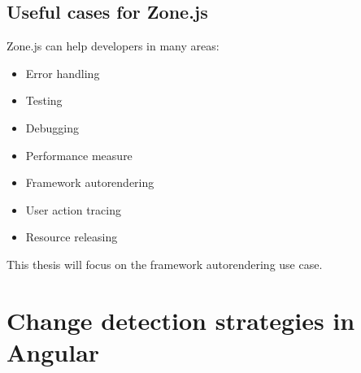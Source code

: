 \subsection{Useful cases for Zone.js}
Zone.js can help developers in many areas: 
\begin{itemize}
	\item Error handling
	\item Testing
	\item Debugging
	\item Performance measure
	\item Framework autorendering
	\item User action tracing
	\item Resource releasing
\end{itemize}


This thesis will focus on the framework autorendering use case.



\section{Change detection strategies in Angular}
